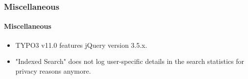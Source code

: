 %

\begin{frame}[fragile]
	\frametitle{Miscellaneous}
	\framesubtitle{Miscellaneous}

	\begin{itemize}
		\item TYPO3 v11.0 features jQuery version 3.5.x.
		\item "Indexed Search" does not log user-specific details in the search
			statistics for privacy reasons anymore.
	\end{itemize}

\end{frame}

